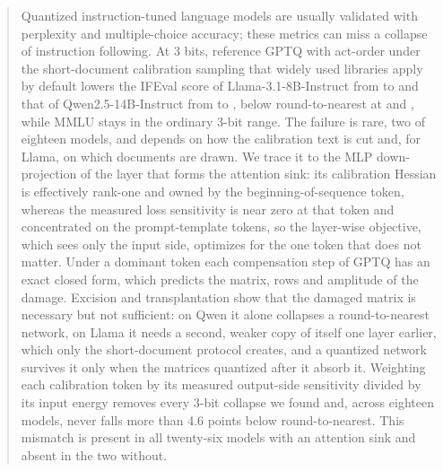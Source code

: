 \begin{abstract}
Quantized instruction-tuned language models are usually validated with perplexity and multiple-choice accuracy; these metrics can miss a collapse of instruction following.
At 3 bits, reference GPTQ with act-order under the short-document calibration sampling that widely used libraries apply by default lowers the IFEval score of Llama-3.1-8B-Instruct from \LfpIF{} to \LgptqIF{} and that of Qwen2.5-14B-Instruct from \QfpIF{} to \QgptqIF{}, below round-to-nearest at \LrtnIF{} and \QrtnIF{}, while MMLU stays in the ordinary 3-bit range.
The failure is rare, two of eighteen models, and depends on how the calibration text is cut and, for Llama, on which documents are drawn.
We trace it to the MLP down-projection of the layer that forms the attention sink: its calibration Hessian is effectively rank-one and owned by the beginning-of-sequence token, whereas the measured loss sensitivity is near zero at that token and concentrated on the prompt-template tokens, so the layer-wise objective, which sees only the input side, optimizes for the one token that does not matter.
Under a dominant token each compensation step of GPTQ has an exact closed form, which predicts the matrix, rows and amplitude of the damage.
Excision and transplantation show that the damaged matrix is necessary but not sufficient: on Qwen it alone collapses a round-to-nearest network, on Llama it needs a second, weaker copy of itself one layer earlier, which only the short-document protocol creates, and a quantized network survives it only when the matrices quantized after it absorb it.
Weighting each calibration token by its measured output-side sensitivity divided by its input energy removes every 3-bit collapse we found and, across eighteen models, never falls more than 4.6 points below round-to-nearest.
This mismatch is present in all twenty-six models with an attention sink and absent in the two without.
\end{abstract}

